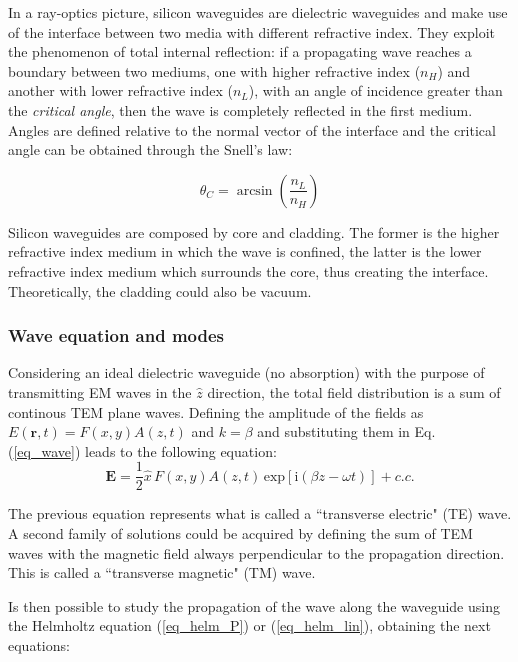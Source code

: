 \documentclass[12pt,a4paper,twoside]{article}
\begin{document}
In a ray-optics picture, silicon waveguides are dielectric waveguides and make use of the interface between two media with different refractive index.
They exploit the phenomenon of total internal reflection: if a propagating wave reaches a boundary between two mediums, one with higher refractive index ($n_H$) and another with lower refractive index ($n_L$), with an angle of incidence greater than the \textit{critical angle}, then the wave is completely reflected in the first medium.
Angles are defined relative to the normal vector of the interface and the critical angle can be obtained through the Snell's law:

$$	\theta_C = \arcsin \left( \frac{n_L}{n_H} \right)$$

Silicon waveguides are composed by core and cladding. %
The former is the higher refractive index medium in which the wave is confined, the latter is the lower refractive index medium which surrounds the core, thus creating the interface. Theoretically, the cladding could also be vacuum.

\subsubsection*{Wave equation and modes}
Considering an ideal dielectric waveguide (no absorption) with the purpose of transmitting EM waves in the $\hat{z}$ direction, the total field distribution is a sum of continous TEM plane waves.
Defining the amplitude of the fields as $E(\textbf{r},t) = F(x,y)A(z,t)$ and $k=\beta$ and substituting them in Eq. (\ref{eq_wave}) leads to the following equation:
\begin{equation*}
	\textbf{E} = \frac{1}{2}\hat{x}\,F(x,y)A(z,t)\,\mathrm{exp}[\mathrm{i}(\beta z-\omega t)] + c.c.
\end{equation*}

The previous equation represents what is called a ``transverse electric" (TE) wave.
A second family of solutions could be acquired by defining the sum of TEM waves with the magnetic field always perpendicular to the propagation direction.
This is called a ``transverse magnetic" (TM) wave.

Is then possible to study the propagation of the wave along the waveguide using the Helmholtz equation (\ref{eq_helm_P}) or (\ref{eq_helm_lin}), obtaining the next equations:
\end{document}
